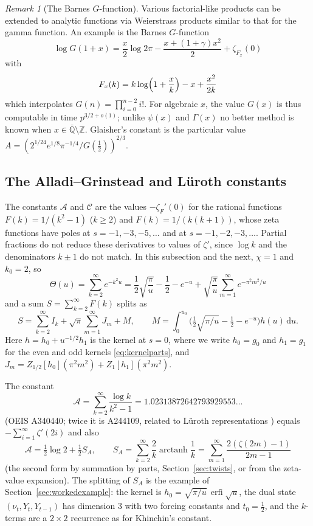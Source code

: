 \documentclass[11pt,reqno]{amsart}
\theoremstyle{definition}
\theoremstyle{remark}
\newtheorem{remark}[theorem]{Remark}
\newcommand{\erfi}{\operatorname{erfi}}
\newcommand{\arctanh}{\operatorname{arctanh}}
\newcommand{\dd}{\,\mathrm{d}}
\newcommand{\Qbar}{\overline{\mathbb{Q}}}
\newcommand{\ZZ}{\mathbb{Z}}
\begin{document}
\begin{remark}[The Barnes $G$-function]
Various factorial-like products can be extended to analytic functions
via Weierstrass products similar to that for the gamma function.
An example is the Barnes $G$-function
\[
  \log G(1+x) = \frac x2\log2\pi - \frac{x + (1+\gamma)x^2}2 + \zeta_{F_x}(0)
\]
with
\[
F_x(k) = k\log\Bigl(1+\frac xk\Bigr) - x + \frac{x^2}{2k}
\]
which interpolates $G(n) = \prod_{i=0}^{n-2} i!$.
For algebraic $x$, the value $G(x)$ is thus computable in time $p^{3/2+o(1)}$;
unlike $\psi(x)$ and $\Gamma(x)$ no better method is known when $x \in \Qbar \setminus \ZZ$.
Glaisher's constant
is the particular value $A = (2^{1/24}e^{1/8}\pi^{-1/4}/G(\frac12))^{2/3}$.
\end{remark}

\subsection{The Alladi--Grinstead and L\"uroth constants}\label{sec:AG}
The constants $\mathcal A$ and $\mathcal C$ are the values $-\zeta_F'(0)$ for the rational functions
$F(k) = 1/(k^2-1)$ ($k \ge 2$) and $F(k) = 1/(k(k+1))$, whose zeta functions have poles at $s = -1, -3, -5, \dots$
and at $s = -1, -2, -3, \dots$. Partial fractions do not reduce these derivatives to values of $\zeta'$, since $\log k$
and the denominators $k \pm 1$ do not match. In this subsection and the next, $\chi = 1$ and $k_0 = 2$, so
\[
  \Theta(u) = \sum_{k=2}^{\infty}e^{-k^2u} = \frac12\sqrt{\frac\pi u} - \frac12 - e^{-u} + \sqrt{\frac\pi u}\sum_{m=1}^{\infty}e^{-\pi^2m^2/u}
\]
and a sum $S = \sum_{k=2}^{\infty}F(k)$ splits as
\[
  S = \sum_{k=2}^{\infty} I_k + \sqrt\pi\sum_{m=1}^{\infty}J_m + M, \qquad
  M = \int_0^{u_0}\bigl(\tfrac12\sqrt{\pi/u} - \tfrac12 - e^{-u}\bigr)h(u)\dd u.
\]
Here $h = h_0 + u^{-1/2}h_1$ is the kernel at $s = 0$, where we write $h_0 = g_0$ and $h_1 = g_1$ for the even and odd
kernels \eqref{eq:kernelparts}, and $J_m = Z_{1/2}[h_0](\pi^2m^2) + Z_1[h_1](\pi^2m^2)$.

The constant
\[
  \mathcal A = \sum_{k=2}^{\infty}\frac{\log k}{k^2-1} = 1.02313872642793929553\ldots
\]
(OEIS A340440; twice it is A244109, related to L\"uroth representations \cite{Kal88,Fin03}) equals
$-\sum_{i=1}^{\infty}\zeta'(2i)$ and also
\[
  \mathcal A = \tfrac12\log2 + \tfrac12 S_A, \qquad
  S_A = \sum_{k=2}^{\infty}\frac{2}{k}\arctanh\frac1k = \sum_{m=1}^{\infty}\frac{2(\zeta(2m)-1)}{2m-1}
\]
(the second form by summation by parts, Section~\ref{sec:twists}, or from the zeta-value expansion). The
splitting of $S_A$ is the example of Section~\ref{sec:workedexample}: the kernel is
$h_0 = \sqrt{\pi/u}\,\erfi\sqrt u$, the dual state $(\nu_t, Y_t, Y_{t-1})$ has dimension $3$ with two forcing
constants and $t_0 = \frac12$, and the $k$-terms are a $2\times2$ recurrence as for Khinchin's constant.
\end{document}
